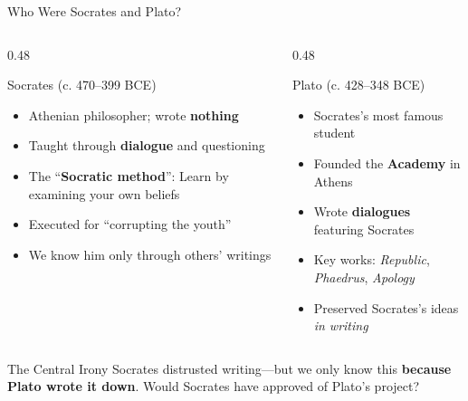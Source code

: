 \documentclass[aspectratio=169]{beamer}
\begin{document}
\begin{frame}{Who Were Socrates and Plato?}
\begin{columns}
\begin{column}{0.48\textwidth}
\begin{block}{Socrates (c. 470--399 BCE)}
\begin{itemize}
  \item Athenian philosopher; wrote \textbf{nothing}
  \item Taught through \textbf{dialogue} and questioning
  \item The ``\textbf{Socratic method}'': Learn by examining your own beliefs
  \item Executed for ``corrupting the youth''
  \item We know him only through others' writings
\end{itemize}
\end{block}
\end{column}

\begin{column}{0.48\textwidth}
\begin{exampleblock}{Plato (c. 428--348 BCE)}
\begin{itemize}
  \item Socrates's most famous student
  \item Founded the \textbf{Academy} in Athens
  \item Wrote \textbf{dialogues} featuring Socrates
  \item Key works: \textit{Republic}, \textit{Phaedrus}, \textit{Apology}
  \item Preserved Socrates's ideas \textit{in writing}
\end{itemize}
\end{exampleblock}
\end{column}
\end{columns}

\vspace{0.5em}
\begin{alertblock}{The Central Irony}
Socrates distrusted writing---but we only know this \textbf{because Plato wrote it down}. Would Socrates have approved of Plato's project?
\end{alertblock}
\end{frame}
\end{document}

